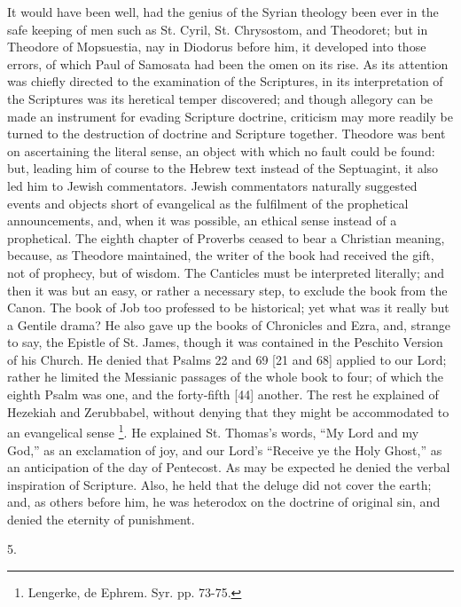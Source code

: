 It would have been well, had the genius of the Syrian theology been
ever in the safe keeping of men such as St. Cyril, St. Chrysostom, and
Theodoret; but in Theodore of Mopsuestia, nay in Diodorus before him,
it developed into those errors, of which Paul of Samosata had been the
omen on its rise. As its attention was chiefly directed to the
examination of the Scriptures, in its interpretation of the Scriptures
was its heretical temper discovered; and though allegory can be made
an instrument for evading Scripture doctrine, criticism may more
readily be turned to the destruction of doctrine and Scripture
together. Theodore was bent on ascertaining the literal sense, an
object with which no fault could be found: but, leading him of course
to the Hebrew text instead of the Septuagint, it also led him to
Jewish commentators. Jewish commentators naturally suggested events
and objects short of evangelical as the fulfilment of the prophetical
announcements, and, when it was possible, an ethical sense instead of
a prophetical. The eighth chapter of Proverbs ceased to bear a
Christian meaning, because, as Theodore maintained, the writer of the
book had received the gift, not of prophecy, but of wisdom. The
Canticles must be interpreted literally; and then it was but an easy,
or rather a necessary step, to exclude the book from the Canon. The
book of Job too professed to be historical; yet what was it really but
a Gentile drama? He also gave up the books of Chronicles and Ezra,
and, strange to say, the Epistle of St. James, though it was contained
in the Peschito Version of his Church. He denied that Psalms 22 and 69
[21 and 68] applied to our Lord; rather he limited the Messianic
passages of the whole book to four; of which the eighth Psalm was one,
and the forty-fifth [44] another. The rest he explained of Hezekiah
and Zerubbabel, without denying that they might be accommodated to an
evangelical sense \footnote{Lengerke, de Ephrem. Syr. pp. 73-75.}. He
explained St. Thomas's words, ``My Lord and my God,'' as an
exclamation of joy, and our Lord's ``Receive ye the Holy
Ghost,'' as an anticipation of the day of Pentecost. As may be
expected he denied the verbal inspiration of Scripture. Also, he held
that the deluge did not cover the earth; and, as others before him, he
was heterodox on the doctrine of original sin, and denied the eternity
of punishment.

5.

